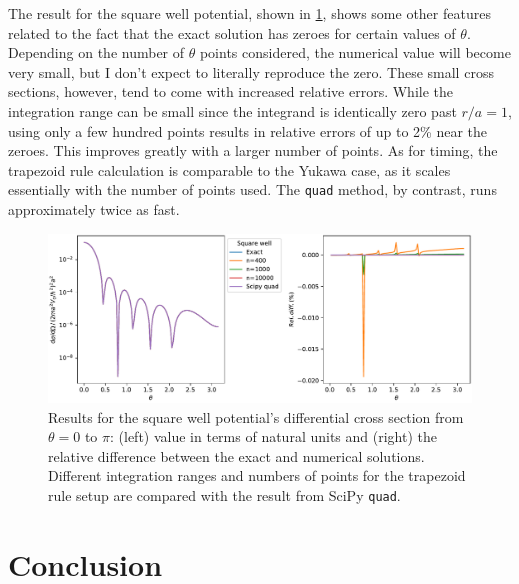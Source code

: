 \documentclass{project}
\begin{document}
The result for the square well potential, shown in \cref{fig:sqwell}, shows some other features related to the fact that the exact solution has zeroes for certain values of $\theta$. Depending on the number of $\theta$ points considered, the numerical value will become very small, but I don't expect to literally reproduce the zero. These small cross sections, however, tend to come with increased relative errors. While the integration range can be small since the integrand is identically zero past $r/a=1$, using only a few hundred points results in relative errors of up to 2\% near the zeroes. This improves greatly with a larger number of points. As for timing, the trapezoid rule calculation is comparable to the Yukawa case, as it scales essentially with the number of points used. The \texttt{quad} method, by contrast, runs approximately twice as fast.

\begin{figure}[tbp]
  \begin{center}
  \includegraphics[width=\textwidth]{fig/example/sqwell_born_xs.pdf}
  \caption{Results for the square well potential's differential cross section from $\theta=0$ to $\pi$: (left) value in terms of natural units and (right) the relative difference between the exact and numerical solutions. Different integration ranges and numbers of points for the trapezoid rule setup are compared with the result from SciPy \texttt{quad}.\label{fig:sqwell}}
  \end{center}
\end{figure}

\section{Conclusion}
\end{document}
